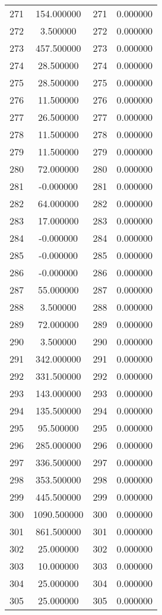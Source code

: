 \documentclass[12pt]{article}
\begin{document}
\begin{longtable}{@{}cccc@{}}
271 & 154.000000 & 271 & 0.000000 \\
272 & 3.500000 & 272 & 0.000000 \\
273 & 457.500000 & 273 & 0.000000 \\
274 & 28.500000 & 274 & 0.000000 \\
275 & 28.500000 & 275 & 0.000000 \\
276 & 11.500000 & 276 & 0.000000 \\
277 & 26.500000 & 277 & 0.000000 \\
278 & 11.500000 & 278 & 0.000000 \\
279 & 11.500000 & 279 & 0.000000 \\
280 & 72.000000 & 280 & 0.000000 \\
281 & -0.000000 & 281 & 0.000000 \\
282 & 64.000000 & 282 & 0.000000 \\
283 & 17.000000 & 283 & 0.000000 \\
284 & -0.000000 & 284 & 0.000000 \\
285 & -0.000000 & 285 & 0.000000 \\
286 & -0.000000 & 286 & 0.000000 \\
287 & 55.000000 & 287 & 0.000000 \\
288 & 3.500000 & 288 & 0.000000 \\
289 & 72.000000 & 289 & 0.000000 \\
290 & 3.500000 & 290 & 0.000000 \\
291 & 342.000000 & 291 & 0.000000 \\
292 & 331.500000 & 292 & 0.000000 \\
293 & 143.000000 & 293 & 0.000000 \\
294 & 135.500000 & 294 & 0.000000 \\
295 & 95.500000 & 295 & 0.000000 \\
296 & 285.000000 & 296 & 0.000000 \\
297 & 336.500000 & 297 & 0.000000 \\
298 & 353.500000 & 298 & 0.000000 \\
299 & 445.500000 & 299 & 0.000000 \\
300 & 1090.500000 & 300 & 0.000000 \\
301 & 861.500000 & 301 & 0.000000 \\
302 & 25.000000 & 302 & 0.000000 \\
303 & 10.000000 & 303 & 0.000000 \\
304 & 25.000000 & 304 & 0.000000 \\
305 & 25.000000 & 305 & 0.000000 \\

\end{longtable}
\end{document}
